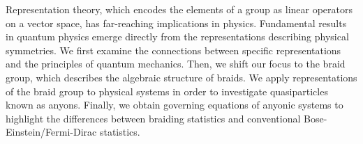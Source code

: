 Representation theory, which encodes the elements of a group as linear operators on a vector space, has far-reaching implications in physics.
Fundamental results in quantum physics emerge directly from the representations describing physical symmetries. We first examine the connections between specific representations and the principles of quantum mechanics. Then, we shift our focus to the braid group, which describes the algebraic structure of braids. We apply representations of the braid group to physical systems in order to investigate quasiparticles known as anyons. Finally, we obtain governing equations of anyonic systems to highlight the differences between braiding statistics and conventional Bose-Einstein/Fermi-Dirac statistics.